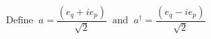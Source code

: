 \begin{equation}
\textrm{Define}\;\; a= \frac{(e_q+ie_p)}{\sqrt{2}} \;\; 
\textrm{and} \;\; a^\dag= \frac{(e_q-ie_p)}{\sqrt{2}}
\label{eq:crumops}
\end{equation}

